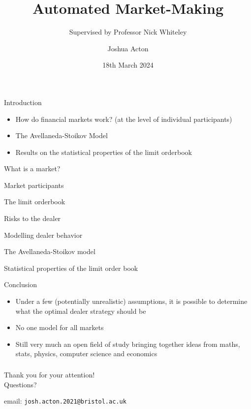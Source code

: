 \documentclass{beamer} %
\title{Automated Market-Making}
\author{Joshua Acton}
\date{18th March 2024}
\subtitle{Supervised by Professor Nick Whiteley}
\begin{document}
\begin{frame}
    \titlepage
\end{frame}

\begin{frame}{Introduction}
    \begin{itemize}
    \item How do financial markets work? (at the level of individual participants)
    \item The Avellaneda-Stoikov Model
    \item Results on the statistical properties of the limit orderbook
    \end{itemize}
\end{frame}

\begin{frame}{What is a market?}
    
\end{frame}

\begin{frame}{Market participants}
    
\end{frame}

\begin{frame}{The limit orderbook}
    
\end{frame}

\begin{frame}{Risks to the dealer}
    
\end{frame}

\begin{frame}{Modelling dealer behavior}
    
\end{frame}

\begin{frame}{The Avellaneda-Stoikov model}
    
\end{frame}

\begin{frame}{Statistical properties of the limit order book}
    
\end{frame}

\begin{frame}{Conclusion}
    \begin{itemize}
        \item Under a few (potentially unrealistic) assumptions, it is
        possible to determine what the optimal dealer strategy should be
        \item No one model for all markets
        \item Still very much an open field of study bringing together ideas
        from maths, stats, physics, computer science and economics
    \end{itemize}
\end{frame}

\begin{frame}
    \frametitle{}
    \begin{center}
        \large{Thank you for your attention!}\\
        \vspace{1cm}
        Questions?
        \vspace{2cm}

        email: \texttt{josh.acton.2021@bristol.ac.uk}
    \end{center}
\end{frame}
\end{document}
